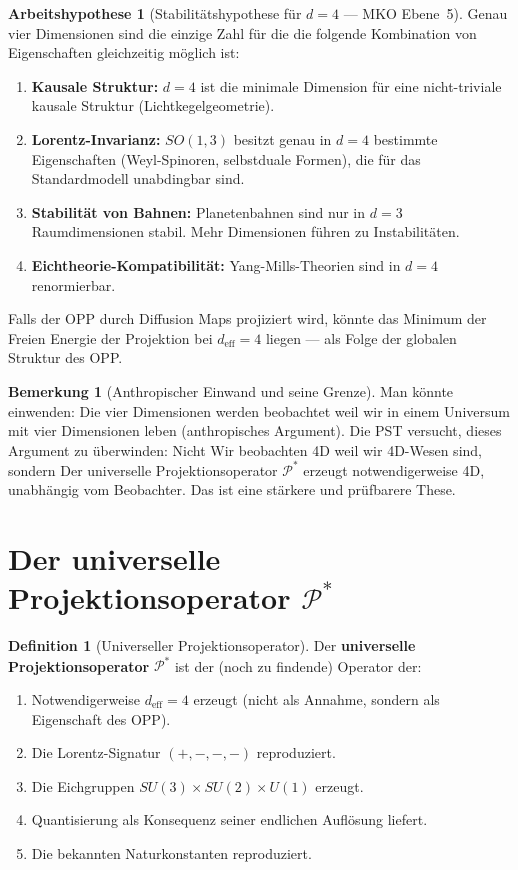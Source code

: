 \documentclass[11pt,a4paper]{article}
\theoremstyle{plain}
\theoremstyle{definition}
\newtheorem{definition}{Definition}[section]
\newtheorem{remark}{Bemerkung}[section]
\newtheorem{hypothese}{Arbeitshypothese}[section]
\newcommand{\deff}{d_{\mathrm{eff}}}
\newcommand{\Proj}{\mathcal{P}}
\begin{document}
\begin{hypothese}[Stabilitätshypothese f\"{u}r $d = 4$ --- MKO Ebene~5]
Genau vier Dimensionen sind die einzige Zahl f\"{u}r die die folgende
Kombination von Eigenschaften gleichzeitig m\"{o}glich ist:
\begin{enumerate}
  \item \textbf{Kausale Struktur:} $d = 4$ ist die minimale Dimension
        f\"{u}r eine nicht-triviale kausale Struktur (Lichtkegelgeometrie).
  \item \textbf{Lorentz-Invarianz:} $SO(1,3)$ besitzt genau in $d = 4$
        bestimmte Eigenschaften (Weyl-Spinoren, selbstduale Formen), die
        f\"{u}r das Standardmodell unabdingbar sind.
  \item \textbf{Stabilit\"{a}t von Bahnen:} Planetenbahnen sind nur in
        $d = 3$ Raumdimensionen stabil. Mehr Dimensionen f\"{u}hren zu
        Instabilit\"{a}ten.
  \item \textbf{Eichtheorie-Kompatibilit\"{a}t:} Yang-Mills-Theorien sind
        in $d = 4$ renormierbar.
\end{enumerate}
Falls der OPP durch Diffusion Maps projiziert wird, k\"{o}nnte das
Minimum der Freien Energie der Projektion bei $\deff = 4$ liegen ---
als Folge der globalen Struktur des OPP.
\end{hypothese}

\begin{remark}[Anthropischer Einwand und seine Grenze]
Man k\"{o}nnte einwenden: Die vier Dimensionen werden beobachtet weil
wir in einem Universum mit vier Dimensionen leben (anthropisches
Argument). Die PST versucht, dieses Argument zu \"{u}berwinden: Nicht
\glqq{}Wir beobachten 4D weil wir 4D-Wesen sind\grqq{}, sondern
\glqq{}Der universelle Projektionsoperator $\Proj^\ast$ erzeugt
notwendigerweise 4D, unabh\"{a}ngig vom Beobachter.\grqq{} Das ist eine
st\"{a}rkere und pr\"{u}fbarere These.
\end{remark}

\section{Der universelle Projektionsoperator $\Proj^\ast$}

\begin{definition}[Universeller Projektionsoperator]
Der \textbf{universelle Projektionsoperator} $\Proj^\ast$ ist der
(noch zu findende) Operator der:
\begin{enumerate}
  \item Notwendigerweise $\deff = 4$ erzeugt (nicht als Annahme,
        sondern als Eigenschaft des OPP).
  \item Die Lorentz-Signatur $(+,-,-,-)$ reproduziert.
  \item Die Eichgruppen $SU(3) \times SU(2) \times U(1)$ erzeugt.
  \item Quantisierung als Konsequenz seiner endlichen Aufl\"{o}sung liefert.
  \item Die bekannten Naturkonstanten reproduziert.
\end{enumerate}
\end{definition}
\end{document}
